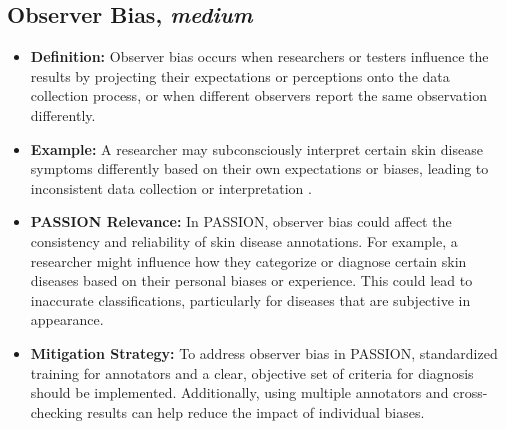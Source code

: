 \begin{refsection}
		\subsection{Observer Bias, \textit{medium}}
		\begin{itemize}
			\item \textbf{Definition:} Observer bias occurs when researchers or testers influence the results by projecting their expectations or perceptions onto the data collection process, or when different observers report the same observation differently.
			\item \textbf{Example:} A researcher may subconsciously interpret certain skin disease symptoms differently based on their own expectations or biases, leading to inconsistent data collection or interpretation \autocite{Mester_2022}.
			\item \textbf{PASSION Relevance:} In PASSION, observer bias could affect the consistency and reliability of skin disease annotations. For example, a researcher might influence how they categorize or diagnose certain skin diseases based on their personal biases or experience. This could lead to inaccurate classifications, particularly for diseases that are subjective in appearance.
			\item \textbf{Mitigation Strategy:} To address observer bias in PASSION, standardized training for annotators and a clear, objective set of criteria for diagnosis should be implemented. Additionally, using multiple annotators and cross-checking results can help reduce the impact of individual biases.
		\end{itemize}
		

\end{refsection}
